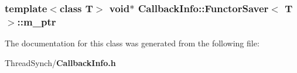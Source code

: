 \subsubsection{\setlength{\rightskip}{0pt plus 5cm}template$<$class T$>$ void$\ast$ {\bf Callback\-Info::Functor\-Saver}$<$ T $>$::{\bf m\_\-ptr}\hspace{0.3cm}{\tt  [private]}}\label{class_callback_info_1_1_functor_saver_577d2cb25fdda59f7e43a5ccf00d19d3}




The documentation for this class was generated from the following file:\begin{CompactItemize}
\item 
Thread\-Synch/{\bf Callback\-Info.h}\end{CompactItemize}
